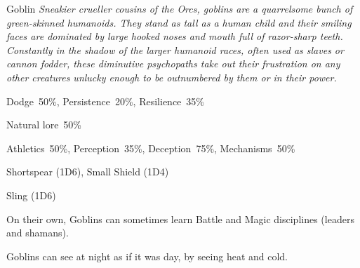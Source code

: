 \newpage


\begin{monsterbox}{Goblin}
	\textit{Sneakier crueller cousins of the Orcs, goblins are a quarrelsome bunch of green-skinned humanoids. They stand as tall as a human child and their smiling faces are dominated by large hooked noses and mouth full of razor-sharp teeth. Constantly in the shadow of the larger humanoid races, often used as slaves or cannon fodder, these diminutive psychopaths take out their frustration on any other creatures unlucky enough to be outnumbered by them or in their power.}\\
	\rpghline
	\basics[%
        hitpoints  = 9, %
	majorwound = 5,
	damagemodifier = 0,
	powerpoints = 10,
	movementrate = 15m,
	armor = Leather (2AP),
	plunderrating = 1
	]
	\rpghline%
	\stats[ %
		STR = 2D6+3 (10),
		CON = 2D6+3 (10),
		DEX = 5D6   (17),
		SIZ = 2D6   (7),
		INT = 3D6   (11),
		POW = 2D6+3 (10),
		CHA = 2D6   (7)
	]
	\rpghline%
	\begin{rpg-monsteraction}[Resistances]
		Dodge~50\%, Persistence~20\%, Resilience~35\%
	\end{rpg-monsteraction}
	\begin{rpg-monsteraction}[Knowledge]
    		Natural lore~50\%
	\end{rpg-monsteraction}
	\begin{rpg-monsteraction}[Practical]
		Athletics~50\%, Perception~35\%, Deception~75\%, Mechanisms~50\%
	\end{rpg-monsteraction}
	\begin{rpg-monsteraction}
		Shortspear (1D6), Small Shield (1D4)
	\end{rpg-monsteraction}
	\begin{rpg-monsteraction}
		Sling (1D6)
	\end{rpg-monsteraction}
	\begin{rpg-monsteraction}[Supernatural]
		On their own, Goblins can sometimes learn Battle and Magic disciplines (leaders and shamans).
	\end{rpg-monsteraction}
	\begin{rpg-monsteraction}[Thermoception]
		Goblins can see at night as if it was day, by seeing heat and cold.
	\end{rpg-monsteraction}

\end{monsterbox}


